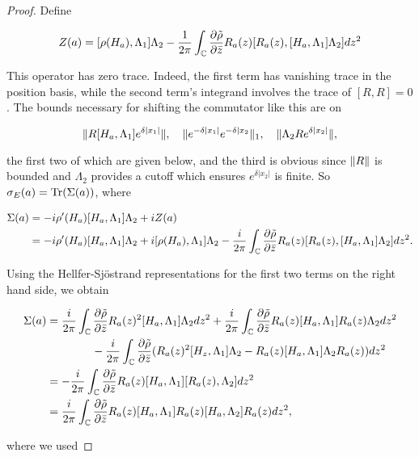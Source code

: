 \documentclass[12pt, letterpaper]{article}
\begin{document}
\begin{proof}

Define 

\[ Z(a) = [\rho(H_a),\Lambda_1]\Lambda_2 - \frac{1}{2\pi}\int_{\mathbb{C}} \frac{\partial \tilde{\rho}}{\partial \bar{z}} R_a(z)[R_a(z),[H_a,\Lambda_1]\Lambda_2] dz^2 \]

This operator has zero trace. Indeed, the first term has vanishing trace in the position basis, while the second term's integrand involves the trace of $[R,R]=0$. The bounds necessary for shifting the commutator like this are on 

\[\lVert R[H_a,\Lambda_1]e^{\delta |x_1|} \rVert, \quad \lVert e^{-\delta |x_1|}e^{-\delta|x_2} \rVert_1, \quad \lVert \Lambda_2 R e^{\delta |x_2|} \rVert,\]

the first two of which are given below, and the third is obvious since $\lVert R \rVert$ is bounded and $\Lambda_2$ provides a cutoff which ensures $e^{\delta|x_2|}$ is finite. So $\sigma_E(a) = \text{Tr}(\Sigma(a))$, where

\[\begin{aligned}
\Sigma(a) &=  -i\rho'(H_a)[H_a,\Lambda_1]\Lambda_2 + iZ(a)\\
&= -i\rho'(H_a)[H_a,\Lambda_1]\Lambda_2 + i[\rho(H_a),\Lambda_1]\Lambda_2 - \frac{i}{2\pi}\int_{\mathbb{C}}\frac{\partial \tilde{\rho}}{\partial \bar{z}} R_a(z)[R_a(z),[H_a,\Lambda_1]\Lambda_2] dz^2.
\end{aligned}\]

Using the Hellfer-Sj\"{o}strand representations for the first two terms on the right hand side, we obtain

\[\begin{aligned}
\Sigma(a) &= \frac{i}{2\pi}\int_{\mathbb{C}} \frac{\partial \tilde{\rho}}{\partial\bar{z}} R_a(z)^2[H_a,\Lambda_1]\Lambda_2 dz^2 + \frac{i}{2\pi}\int_{\mathbb{C}}\frac{\partial \tilde{\rho}}{\partial\bar{z}} R_a(z)[H_a,\Lambda_1]R_a(z)\Lambda_2dz^2 \\
&\quad\quad\quad\quad - \frac{i}{2\pi}\int_{\mathbb{C}} \frac{\partial \tilde{\rho}}{\partial\bar{z}} (R_a(z)^2[H_z,\Lambda_1]\Lambda_2 - R_a(z)[H_a,\Lambda_1]\Lambda_2 R_a(z)) dz^2\\
&= -\frac{i}{2\pi}\int_{\mathbb{C}}\frac{\partial \tilde{\rho}}{\partial\bar{z}} R_a(z)[H_a,\Lambda_1][R_a(z),\Lambda_2]dz^2\\
&= \frac{i}{2\pi}\int_{\mathbb{C}} \frac{\partial \tilde{\rho}}{\partial \bar{z}} R_a(z)[H_a,\Lambda_1]R_a(z)[H_a,\Lambda_2]R_a(z) dz^2,
\end{aligned}\]

where we used 


\end{proof}
\end{document}
